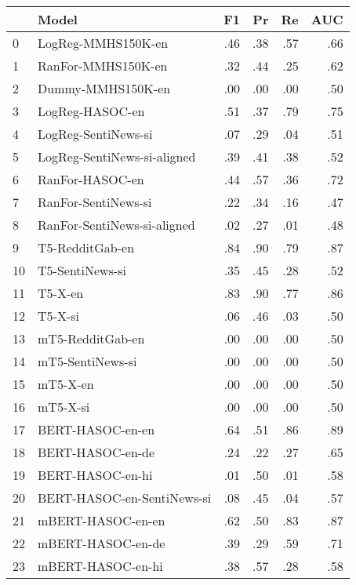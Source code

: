 \begin{tabular}{llrrrr}
\toprule
{} &                        Model &  F1 &  Pr &  Re & AUC \\
\midrule
0  &           LogReg-MMHS150K-en & .46 & .38 & .57 & .66 \\
1  &           RanFor-MMHS150K-en & .32 & .44 & .25 & .62 \\
2  &            Dummy-MMHS150K-en & .00 & .00 & .00 & .50 \\
3  &              LogReg-HASOC-en & .51 & .37 & .79 & .75 \\
4  &          LogReg-SentiNews-si & .07 & .29 & .04 & .51 \\
5  &  LogReg-SentiNews-si-aligned & .39 & .41 & .38 & .52 \\
6  &              RanFor-HASOC-en & .44 & .57 & .36 & .72 \\
7  &          RanFor-SentiNews-si & .22 & .34 & .16 & .47 \\
8  &  RanFor-SentiNews-si-aligned & .02 & .27 & .01 & .48 \\
9  &              T5-RedditGab-en & .84 & .90 & .79 & .87 \\
10 &              T5-SentiNews-si & .35 & .45 & .28 & .52 \\
11 &                      T5-X-en & .83 & .90 & .77 & .86 \\
12 &                      T5-X-si & .06 & .46 & .03 & .50 \\
13 &             mT5-RedditGab-en & .00 & .00 & .00 & .50 \\
14 &             mT5-SentiNews-si & .00 & .00 & .00 & .50 \\
15 &                     mT5-X-en & .00 & .00 & .00 & .50 \\
16 &                     mT5-X-si & .00 & .00 & .00 & .50 \\
17 &             BERT-HASOC-en-en & .64 & .51 & .86 & .89 \\
18 &             BERT-HASOC-en-de & .24 & .22 & .27 & .65 \\
19 &             BERT-HASOC-en-hi & .01 & .50 & .01 & .58 \\
20 &   BERT-HASOC-en-SentiNews-si & .08 & .45 & .04 & .57 \\
21 &            mBERT-HASOC-en-en & .62 & .50 & .83 & .87 \\
22 &            mBERT-HASOC-en-de & .39 & .29 & .59 & .71 \\
23 &            mBERT-HASOC-en-hi & .38 & .57 & .28 & .58 \\

\end{tabular}
